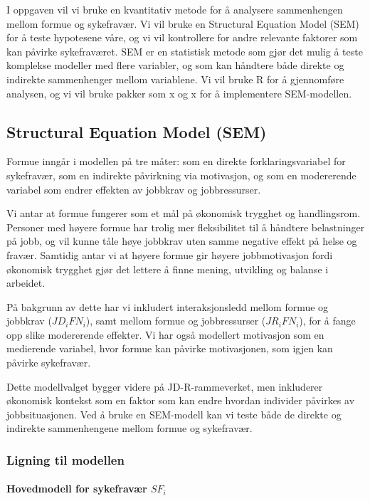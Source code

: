 \documentclass[
  12pt,
  a4paper,
  DIV=11,
  numbers=noendperiod]{scrartcl}
\let\oldparagraph\paragraph
\renewcommand{\paragraph}[1]{\oldparagraph{#1}\mbox{}}
\begin{document}
I oppgaven vil vi bruke en kvantitativ metode for å analysere
sammenhengen mellom formue og sykefravær. Vi vil bruke en Structural
Equation Model (SEM) for å teste hypotesene våre, og vi vil kontrollere
for andre relevante faktorer som kan påvirke sykefraværet. SEM er en
statistisk metode som gjør det mulig å teste komplekse modeller med
flere variabler, og som kan håndtere både direkte og indirekte
sammenhenger mellom variablene. Vi vil bruke R for å gjennomføre
analysen, og vi vil bruke pakker som x og x for å implementere
SEM-modellen.

\subsection{Structural Equation Model
(SEM)}\label{structural-equation-model-sem}

Formue inngår i modellen på tre måter: som en direkte
forklaringsvariabel for sykefravær, som en indirekte påvirkning via
motivasjon, og som en modererende variabel som endrer effekten av
jobbkrav og jobbressurser.

Vi antar at formue fungerer som et mål på økonomisk trygghet og
handlingsrom. Personer med høyere formue har trolig mer fleksibilitet
til å håndtere belastninger på jobb, og vil kunne tåle høye jobbkrav
uten samme negative effekt på helse og fravær. Samtidig antar vi at
høyere formue gir høyere jobbmotivasjon fordi økonomisk trygghet gjør
det lettere å finne mening, utvikling og balanse i arbeidet.

På bakgrunn av dette har vi inkludert interaksjonsledd mellom formue og
jobbkrav (\(JD_i FN_i\)), samt mellom formue og jobbressurser
(\(JR_i FN_i\)), for å fange opp slike modererende effekter. Vi har også
modellert motivasjon som en medierende variabel, hvor formue kan påvirke
motivasjonen, som igjen kan påvirke sykefravær.

Dette modellvalget bygger videre på JD-R-rammeverket, men inkluderer
økonomisk kontekst som en faktor som kan endre hvordan individer
påvirkes av jobbsituasjonen. Ved å bruke en SEM-modell kan vi teste både
de direkte og indirekte sammenhengene mellom formue og sykefravær.

\subsubsection{Ligning til modellen}\label{ligning-til-modellen}

\paragraph{\texorpdfstring{Hovedmodell for sykefravær
\(SF_i\)}{Hovedmodell for sykefravær SF\_i}}\label{hovedmodell-for-sykefravuxe6r-sf_i}
\end{document}
